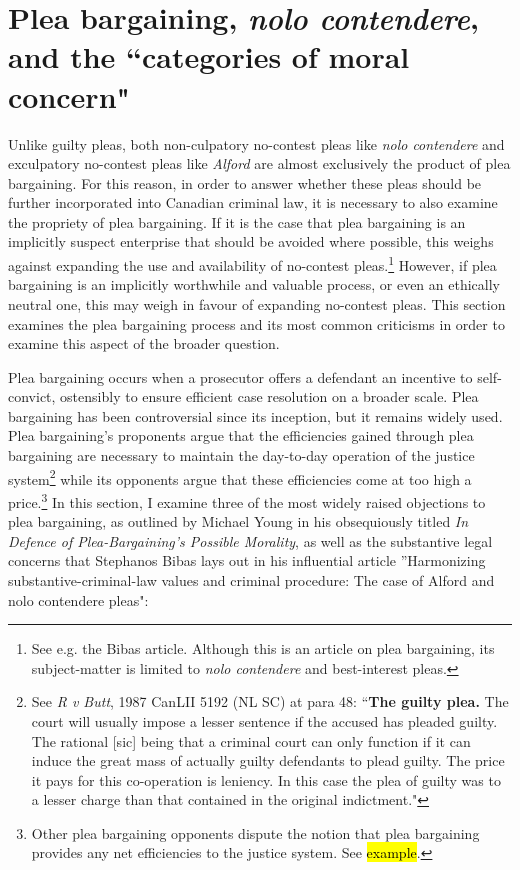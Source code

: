 \section{Plea bargaining, \textit{nolo contendere}, and the ``categories of moral concern"}

Unlike guilty pleas, both non-culpatory no-contest pleas like \textit{nolo contendere} and exculpatory no-contest pleas like \textit{Alford} are almost exclusively the product of plea bargaining. For this reason, in order to answer whether these pleas should be further incorporated into Canadian criminal law, it is necessary to also examine the propriety of plea bargaining. If it is the case that plea bargaining is an implicitly suspect enterprise that should be avoided where possible, this weighs against expanding the use and availability of no-contest pleas.\footnote{See e.g. the Bibas article. Although this is an article on plea bargaining, its subject-matter is limited to \textit{nolo contendere} and best-interest pleas.} However, if plea bargaining is an implicitly worthwhile and valuable process, or even an ethically neutral one, this may weigh in favour of expanding no-contest pleas. This section examines the plea bargaining process and its most common criticisms in order to examine this aspect of the broader question.

Plea bargaining occurs when a prosecutor offers a defendant an incentive to self-convict, ostensibly to ensure efficient case resolution on a broader scale. Plea bargaining has been controversial since its inception, but it remains widely used. Plea bargaining's proponents argue that the efficiencies gained through plea bargaining are necessary to maintain the day-to-day operation of the justice system\footnote{See \textit{R v Butt}, 1987 CanLII 5192 (NL SC) at para 48: ``\textbf{The guilty plea.} The court will usually impose a lesser sentence if the accused has pleaded guilty. The rational [sic] being that a criminal court can only function if it can induce the great mass of actually guilty defendants to plead guilty. The price it pays for this co-operation is leniency. In this case the plea of guilty was to a lesser charge than that contained in the original indictment."} while its opponents argue that these efficiencies come at too high a price.\footnote{Other plea bargaining opponents dispute the notion that plea bargaining provides any net efficiencies to the justice system. See \hl{example}.} In this section, I examine three of the most widely raised objections to plea bargaining, as outlined by Michael Young in his obsequiously titled \textit{In Defence of Plea-Bargaining's Possible Morality}, as well as the substantive legal concerns that Stephanos Bibas lays out in his influential article ''Harmonizing substantive-criminal-law values and criminal procedure: The case of Alford and nolo contendere pleas":

